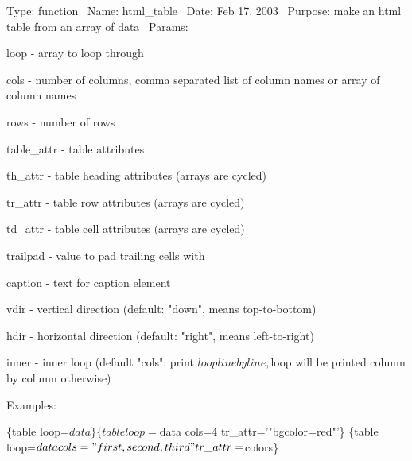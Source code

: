 Type\+: function~\newline
 Name\+: html\+\_\+table~\newline
 Date\+: Feb 17, 2003~\newline
 Purpose\+: make an html table from an array of data~\newline
 Params\+: 
\begin{DoxyPre}
\begin{DoxyItemize}
\item loop       - array to loop through
\item cols       - number of columns, comma separated list of column names
               or array of column names
\item rows       - number of rows
\item table\_attr - table attributes
\item th\_attr    - table heading attributes (arrays are cycled)
\item tr\_attr    - table row attributes (arrays are cycled)
\item td\_attr    - table cell attributes (arrays are cycled)
\item trailpad   - value to pad trailing cells with
\item caption    - text for caption element
\item vdir       - vertical direction (default: "down", means top-to-bottom)
\item hdir       - horizontal direction (default: "right", means left-to-right)
\item inner      - inner loop (default "cols": print $loop line by line,
               $loop will be printed column by column otherwise)

Examples:

\begin{DoxyPre}
\{table loop=$data\}
\{table loop=$data cols=4 tr\_attr='"bgcolor=red"'\}
\{table loop=$data cols="first,second,third" tr\_attr=$colors\}
\end{DoxyPre}

\end{DoxyItemize}\end{DoxyPre}



